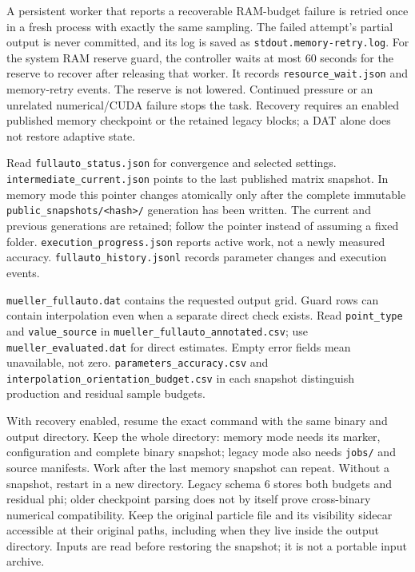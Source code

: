 A persistent worker that reports a recoverable RAM-budget failure is
retried once in a fresh process with exactly the same sampling. The
failed attempt's partial output is never committed, and its log is saved
as \texttt{stdout.memory-retry.log}. For the system RAM reserve guard,
the controller waits at most 60 seconds for the reserve to recover after
releasing that worker. It records \nolinkurl{resource_wait.json} and
memory-retry events. The reserve is not lowered. Continued pressure or
an unrelated numerical/CUDA failure stops the task. Recovery requires an
enabled published memory checkpoint or the retained legacy blocks; a DAT
alone does not restore adaptive state.

Read \nolinkurl{fullauto_status.json} for convergence and selected
settings. \nolinkurl{intermediate_current.json} points to the last
published matrix snapshot. In memory mode this pointer changes
atomically only after the complete immutable
\texttt{public\_snapshots/\textless{}hash\textgreater{}/} generation has
been written. The current and previous generations are retained; follow
the pointer instead of assuming a fixed folder.
\nolinkurl{execution_progress.json} reports active work, not a newly
measured accuracy. \nolinkurl{fullauto_history.jsonl} records parameter
changes and execution events.

\nolinkurl{mueller_fullauto.dat} contains the requested output grid. Guard
rows can contain interpolation even when a separate direct check exists.
Read \nolinkurl{point_type} and \nolinkurl{value_source} in
\nolinkurl{mueller_fullauto_annotated.csv}; use
\nolinkurl{mueller_evaluated.dat} for direct estimates. Empty error fields
mean unavailable, not zero. \nolinkurl{parameters_accuracy.csv} and
\nolinkurl{interpolation_orientation_budget.csv} in each snapshot
distinguish production and residual sample budgets.

With recovery enabled, resume the exact command with the same binary and
output directory. Keep the whole directory: memory mode needs its
marker, configuration and complete binary snapshot; legacy mode also
needs \nolinkurl{jobs/} and source manifests. Work after the last memory
snapshot can repeat. Without a snapshot, restart in a new directory.
Legacy schema 6 stores both budgets and residual phi; older checkpoint
parsing does not by itself prove cross-binary numerical compatibility.
Keep the original particle file and its visibility sidecar accessible at
their original paths, including when they live inside the output
directory. Inputs are read before restoring the snapshot; it is not a
portable input archive.

